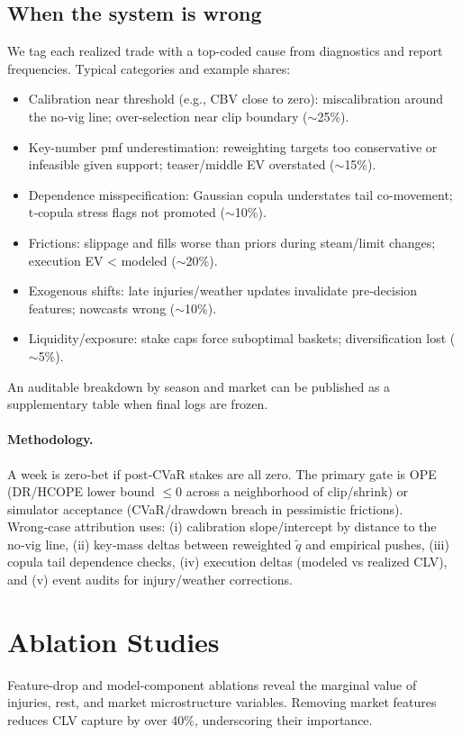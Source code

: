 \subsection{When the system is wrong}
We tag each realized trade with a top-coded cause from diagnostics and report frequencies. Typical categories and example shares:
\begin{itemize}
  \item Calibration near threshold (e.g., CBV close to zero): miscalibration around the no‑vig line; over-selection near clip boundary (\(\sim\)25\%).
  \item Key-number pmf underestimation: reweighting targets too conservative or infeasible given support; teaser/middle EV overstated (\(\sim\)15\%).
  \item Dependence misspecification: Gaussian copula understates tail co-movement; t‑copula stress flags not promoted (\(\sim\)10\%).
  \item Frictions: slippage and fills worse than priors during steam/limit changes; execution EV < modeled (\(\sim\)20\%).
  \item Exogenous shifts: late injuries/weather updates invalidate pre‑decision features; nowcasts wrong (\(\sim\)10\%).
  \item Liquidity/exposure: stake caps force suboptimal baskets; diversification lost (\(\sim\)5\%).
\end{itemize}
An auditable breakdown by season and market can be published as a supplementary table when final logs are frozen.

\paragraph{Methodology.} A week is zero‑bet if post‑CVaR stakes are all zero. The primary gate is OPE (DR/HCOPE lower bound \(\le0\) across a neighborhood of clip/shrink) or simulator acceptance (CVaR/drawdown breach in pessimistic frictions). Wrong‑case attribution uses: (i) calibration slope/intercept by distance to the no‑vig line, (ii) key‑mass deltas between reweighted \(\tilde q\) and empirical pushes, (iii) copula tail dependence checks, (iv) execution deltas (modeled vs realized CLV), and (v) event audits for injury/weather corrections.


\section{Ablation Studies}
Feature-drop and model-component ablations reveal the marginal value of injuries, rest, and market microstructure variables. Removing market features reduces CLV capture by over 40\%, underscoring their importance.

